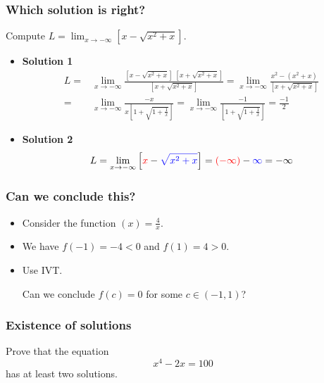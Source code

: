 \documentclass[14pt]{beamer}
\begin{document}
\begin{frame}
	\fontsize{13}{13}\selectfont
	\frametitle{Which solution is right?}
	Compute
	$\displaystyle L = \lim_{x \to -\infty}\left[ x - \sqrt{x^{2}+x}\right]$.

	\begin{itemize}
		\item {\bfseries Solution 1} {\fontsize{11}{11}\selectfont \begin{align*}L =&\lim_{x\to -\infty}\frac{\left[ x - \sqrt{x^{2}+x} \right] \; \left[ x + \sqrt{x^{2}+x} \right]}{\left[ x + \sqrt{x^{2}+x} \right]}= \lim_{x \to -\infty}\frac{x^{2}-(x^{2}+x)}{\left[ x + \sqrt{x^{2}+x} \right]}\\ =&\lim_{x \to -\infty}\frac{-x}{x \left[ 1 + \sqrt{1 + \frac{1}{x}} \right]}= \lim_{x \to -\infty}\frac{-1}{ \left[ 1 + \sqrt{1 + \frac{1}{x}} \right]}= \frac{-1}{2}\end{align*} }

		\item {\bfseries Solution 2}
			\[
				L = \lim_{x \to -\infty}\left[{\color{red} x }-{\color{blue} \sqrt{x^{2}+x} }
				\right] ={\color{red}(-\infty)}-{\color{blue}\infty}= - \infty
			\]
	\end{itemize}
\end{frame}

\begin{frame}
	\frametitle{Can we conclude this?}

	\begin{itemize}
		\item Consider the function $\displaystyle (x)=\frac{4}{x}$.
			\vfill

		\item We have \quad $f(-1)=-4<0$ \quad and \quad $f(1)=4>0$.
			\vfill

		\item Use IVT.

			Can we conclude $f(c)=0$ for some $c\in(-1,1)$?
	\end{itemize}
	\vfill
	\vfill
\end{frame}

\begin{frame}
	\frametitle{Existence of solutions}

	Prove that the equation
	\[
		x^{4}- 2x = 100
	\]
	has at least two solutions.
\end{frame}
\end{document}
